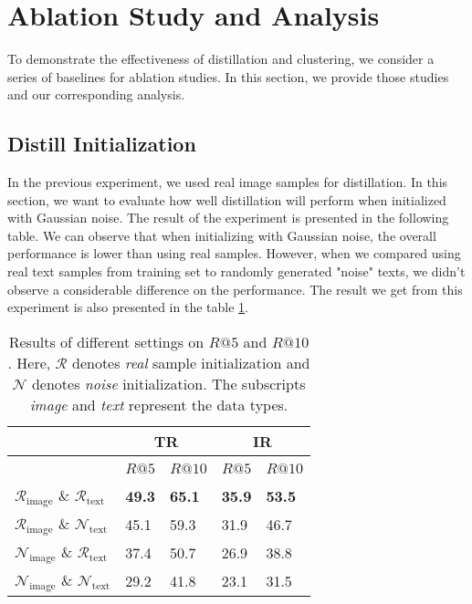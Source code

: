\documentclass[sigconf, nonacm]{acmart}
\begin{document}
\section{Ablation Study and Analysis}
To demonstrate the effectiveness of distillation and clustering, we consider a series of baselines for ablation studies. In this section, we provide those studies and our corresponding analysis.

\subsection{Distill Initialization}
In the previous experiment, we used real image samples for distillation. In this section, we want to evaluate how well distillation will perform when initialized with Gaussian noise. The result of the experiment is presented in the following table. We can observe that when initializing with Gaussian noise, the overall performance is lower than using real samples. However, when we compared using real text samples from training set to randomly generated "noise" texts, we didn't observe a considerable difference on the performance. The result we get from this experiment is also presented in the table \ref{tab:commands}.

\begin{table}[!h]
    \centering
    \caption{Results of different settings on \( R@5 \) and \( R@10 \). \textmd{Here, \(\mathcal{R}\) denotes \textit{real} sample initialization and \(\mathcal{N}\) denotes \textit{noise} initialization. The subscripts \textit{image} and \textit{text} represent the data types.}}
    \label{tab:commands}
    \begin{tabular}{l|l|l|l|l}
    \toprule
        ~ & \multicolumn{2}{c|}{TR} & \multicolumn{2}{c}{IR}  \\ \midrule
        ~ & \( R@5 \) & \( R@10 \) & \( R@5 \) & \( R@10 \)  \\ \midrule
        \( \mathcal{R}_{\text{image}} \) \& \( \mathcal{R}_{\text{text}} \) & \textbf{49.3} & \textbf{65.1} & \textbf{35.9} & \textbf{53.5}  \\ 
        \( \mathcal{R}_{\text{image}} \) \& \( \mathcal{N}_{\text{text}} \) & 45.1 & 59.3 & 31.9 & 46.7  \\ 
        \( \mathcal{N}_{\text{image}} \) \& \( \mathcal{R}_{\text{text}} \) & 37.4 & 50.7 & 26.9 & 38.8  \\ 
        \( \mathcal{N}_{\text{image}} \) \& \( \mathcal{N}_{\text{text}} \) & 29.2 & 41.8 & 23.1 & 31.5  \\ \midrule
    \end{tabular}
\end{table}
\end{document}
